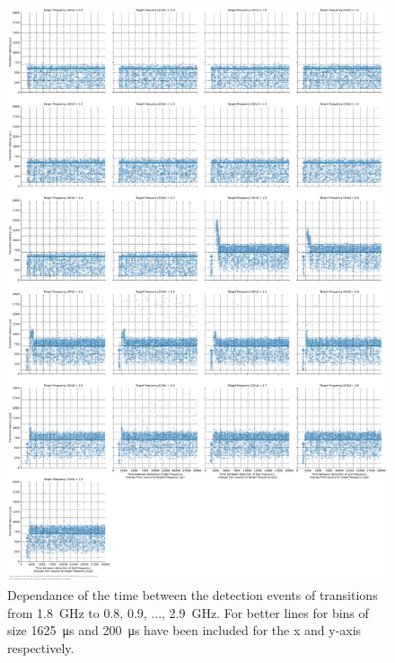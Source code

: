 \begin{figure}[]
    \centering
    \includegraphics[width=\columnwidth]{fig/ftalat/ftalat_scatter_wait_transition_latency_hati_source_1.8.pdf}
    \caption{Dependance of the time between the detection events of transitions from \SI{1.8}{\GHz} to \SI{0.8}{}, \SI{0.9}{}, ..., \SI{2.9}{\GHz}. For better lines for bins of size \SI{1625}{\us} and \SI{200}{\us} have been included for the x and y-axis respectively.}
\end{figure}
